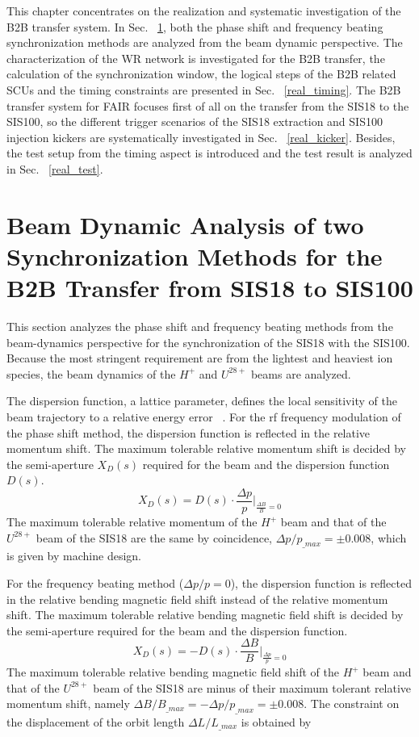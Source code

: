 

This chapter concentrates on the realization and systematic investigation of the \gls{B2B} transfer system. In Sec. ~\ref{real_dyn}, both the phase shift and frequency beating synchronization methods are analyzed from the beam dynamic perspective. The characterization of the WR network is investigated for the B2B transfer, the calculation of the synchronization window, the logical steps of the B2B related SCUs and the timing constraints are presented in Sec. ~\ref{real_timing}. The B2B transfer system for FAIR focuses first of all on the transfer from the SIS18 to the SIS100, so the different trigger scenarios of the SIS18 extraction and SIS100 injection kickers are systematically investigated in Sec. ~\ref{real_kicker}. Besides, the test setup from the timing aspect is introduced and the test result is analyzed in Sec. ~\ref{real_test}. 

\section{Beam Dynamic Analysis of two Synchronization Methods for the B2B Transfer from SIS18 to SIS100}
\label{real_dyn}
This section analyzes the phase shift and frequency beating methods from the beam-dynamics perspective for the synchronization of the SIS18 with the SIS100. Because the most stringent requirement are from the lightest and heaviest ion species, the beam dynamics of the $H^+$ and $U^\mathit{28+}$ beams are analyzed.

The dispersion function, a lattice parameter, defines the local sensitivity of the beam trajectory to a relative energy error ~\cite{lee_accelerator_2011}. For the rf frequency modulation of the phase shift method, the dispersion function is reflected in the relative momentum shift. The maximum tolerable relative momentum shift is decided by the semi-aperture $X_D(s)$ required for the beam and the dispersion function $D(s)$.
\begin{equation}
		X_D(s)=D(s)\cdot \frac{\Delta p}{p}|_\mathit{\frac{\Delta B}{B}=0}
\end{equation}
The maximum tolerable relative momentum of the $H^{+}$ beam and that of the $U^\mathit{28+}$ beam of the SIS18 are the same by coincidence, $\Delta p/p_\mathit{\_max}=\pm0.008$, which is given by machine design. 

For the frequency beating method ($\Delta p/p=0$), the dispersion function is reflected in the relative bending magnetic field shift instead of the relative momentum shift. The maximum tolerable relative bending magnetic field shift is decided by the semi-aperture required for the beam and the dispersion function. 
\begin{equation}
		X_D(s)=-D(s)\cdot \frac{\Delta B}{B}|_\mathit{\frac{\Delta p}{p}=0}
\end{equation}
The maximum tolerable relative bending magnetic field shift of the $H^{+}$ beam and that of the $U^\mathit{28+}$ beam of the SIS18 are minus of their maximum tolerant relative momentum shift, namely $\Delta B/B_\mathit{\_max}=-\Delta p/p_\mathit{\_max}=\pm0.008$. The constraint on the displacement of the orbit length $\Delta L/L_\mathit{\_max}$ is obtained by 

